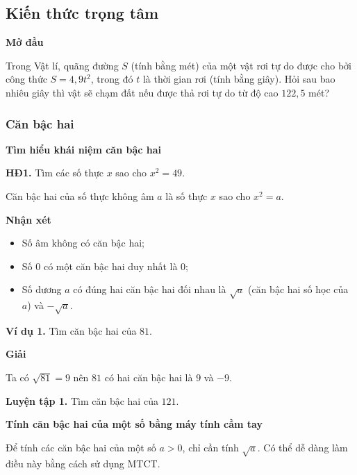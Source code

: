 \begin{lesson}
    \subsection{Kiến thức trọng tâm}

    \textbf{Mở đầu}

    Trong Vật lí, quãng đường $S$ (tính bằng mét) của một vật rơi tự do được cho bởi công thức $S=4{,}9t^2$, trong đó $t$ là thời gian rơi (tính bằng giây). Hỏi sau bao nhiêu giây thì vật sẽ chạm đất nếu được thả rơi tự do từ độ cao $122{,}5$ mét?

    \answerline

    \subsubsection{Căn bậc hai}

    \textbf{Tìm hiểu khái niệm căn bậc hai}

    \textbf{HĐ1.} Tìm các số thực $x$ sao cho $x^2=49$.

    \answerline

    \begin{keyconcept}
        Căn bậc hai của số thực không âm $a$ là số thực $x$ sao cho $x^2=a$.
    \end{keyconcept}

    \textbf{Nhận xét}
    \begin{itemize}
        \item Số âm không có căn bậc hai;
        \item Số $0$ có một căn bậc hai duy nhất là $0$;
        \item Số dương $a$ có đúng hai căn bậc hai đối nhau là $\sqrt{a}$ (căn bậc hai số học của $a$) và $-\sqrt{a}$.
    \end{itemize}

    \textbf{Ví dụ 1.} Tìm căn bậc hai của $81$.

    \textbf{Giải}

    Ta có $\sqrt{81}=9$ nên $81$ có hai căn bậc hai là $9$ và $-9$.

    \textbf{Luyện tập 1.} Tìm căn bậc hai của $121$.

    \answerline

    \textbf{Tính căn bậc hai của một số bằng máy tính cầm tay}

    Để tính các căn bậc hai của một số $a>0$, chỉ cần tính $\sqrt{a}$. Có thể dễ dàng làm điều này bằng cách sử dụng MTCT.


\end{lesson}
